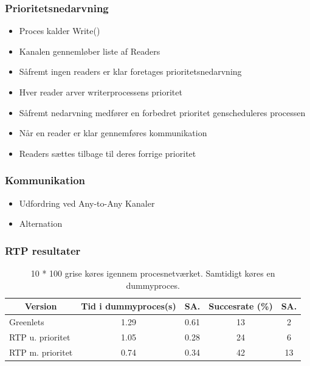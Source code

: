 \documentclass[12pt]{beamer}
\newcommand\mc[1]{\multicolumn{1}{c}{\textbf {#1}}} %
\begin{document}
\begin{frame}
  \frametitle{Prioritetsnedarvning}
\begin{itemize}
	\item Proces kalder Write() 
	\item Kanalen gennemløber liste af Readers
	\item Såfremt ingen readers er klar foretages prioritetsnedarvning
	\item Hver reader arver writerprocessens prioritet 
	\item Såfremt nedarvning medfører en forbedret prioritet genscheduleres processen
	\item Når en reader er klar gennemføres kommunikation
	\item Readers sættes tilbage til deres forrige prioritet
  \end{itemize}
\end{frame}

\begin{frame}
	\frametitle{Kommunikation}
	\begin{itemize}
		\item Udfordring ved Any-to-Any Kanaler 
	 	\item Alternation
	\end{itemize} 
\end{frame} 

\begin{frame}
  	\frametitle{RTP resultater}
	\tiny 
	\begin{table}[htbp]
		\centering
		\begin{tabular}{lcccc}
		   	\toprule
		    \mc{Version}&\mc{Tid i dummyproces(s)}&\mc{SA.}& \mc{Succesrate (\%)}&\mc{SA.}\\
		    \midrule
		    Greenlets         & 1.29 & 0.61 & 13 & 2  \\
		    RTP u. prioritet  & 1.05 & 0.28 & 24 & 6  \\
		    RTP m. prioritet  & 0.74 & 0.34 & 42 & 13 \\
		    \bottomrule
		\end{tabular}
		\caption[]{\tiny 10 * 100 grise køres igennem procesnetværket. Samtidigt køres en dummyproces.}
	\end{table}
\end{frame} 
\end{document}
